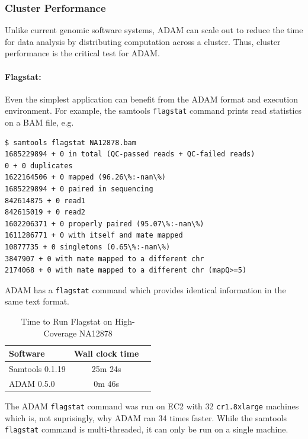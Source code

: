 \documentclass[10pt,twocolumn]{article}
\theoremstyle{plain}
\begin{document}
\subsubsection{Cluster Performance}

Unlike current genomic software systems, ADAM can scale out to reduce the time
for data analysis by distributing computation across a cluster. Thus, cluster performance is the critical test for ADAM.

\paragraph{Flagstat:}
\label{sec:flagstat}

Even the simplest application can benefit from the ADAM format and execution
environment. For example, the samtools \texttt{flagstat} command prints
read statistics on a BAM file, e.g.

\begin{scriptsize}
\begin{verbatim}
$ samtools flagstat NA12878.bam
1685229894 + 0 in total (QC-passed reads + QC-failed reads)
0 + 0 duplicates
1622164506 + 0 mapped (96.26\%:-nan\%)
1685229894 + 0 paired in sequencing
842614875 + 0 read1
842615019 + 0 read2
1602206371 + 0 properly paired (95.07\%:-nan\%)
1611286771 + 0 with itself and mate mapped
10877735 + 0 singletons (0.65\%:-nan\%)
3847907 + 0 with mate mapped to a different chr
2174068 + 0 with mate mapped to a different chr (mapQ>=5)
\end{verbatim}
\end{scriptsize}

ADAM has a \texttt{flagstat} command which provides 
identical information in the same text format.

\begin{table}[h]
\caption{Time to Run Flagstat on High-Coverage NA12878}
\label{tab:time-flagstat}
\begin{center}
\begin{tabular}{| l | c | c |}
\hline
\bf Software  & \bf Wall clock time \\
\hline
Samtools 0.1.19 & 25m 24s \\
ADAM 0.5.0 & 0m 46s \\
\hline
\end{tabular}
\end{center}
\end{table}

The ADAM \texttt{flagstat} command was run on EC2 with 32 \texttt{cr1.8xlarge} machines
which is, not suprisingly, why ADAM ran 34 times faster. While the samtools \texttt{flagstat}
command is multi-threaded, it can only be run on a single machine.
\end{document}
